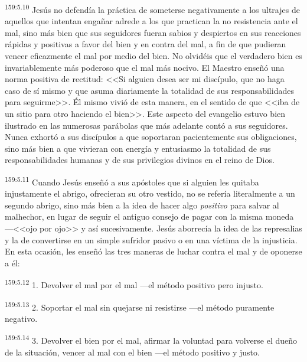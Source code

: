 \par 
\textsuperscript{159:5.10} Jesús no defendía la práctica de someterse negativamente a los ultrajes de aquellos que intentan engañar adrede a los que practican la no resistencia ante el mal, sino más bien que sus seguidores fueran sabios y despiertos en sus reacciones rápidas y positivas a favor del bien y en contra del mal, a fin de que pudieran vencer eficazmente el mal por medio del bien. No olvidéis que el verdadero bien es invariablemente más poderoso que el mal más nocivo. El Maestro enseñó una norma positiva de rectitud: <<Si alguien desea ser mi discípulo, que no haga caso de sí mismo y que asuma diariamente la totalidad de sus responsabilidades para seguirme>>. Él mismo vivió de esta manera, en el sentido de que <<iba de un sitio para otro haciendo el bien>>. Este aspecto del evangelio estuvo bien ilustrado en las numerosas parábolas que más adelante contó a sus seguidores. Nunca exhortó a sus discípulos a que soportaran pacientemente sus obligaciones, sino más bien a que vivieran con energía y entusiasmo la totalidad de sus responsabilidades humanas y de sus privilegios divinos en el reino de Dios.

\par 
\textsuperscript{159:5.11} Cuando Jesús enseñó a sus apóstoles que si alguien les quitaba injustamente el abrigo, ofrecieran su otro vestido, no se refería literalmente a un segundo abrigo, sino más bien a la idea de hacer algo \textit{positivo} para salvar al malhechor, en lugar de seguir el antiguo consejo de pagar con la misma moneda ---<<ojo por ojo>> y así sucesivamente. Jesús aborrecía la idea de las represalias y la de convertirse en un simple sufridor pasivo o en una víctima de la injusticia. En esta ocasión, les enseñó las tres maneras de luchar contra el mal y de oponerse a él:

\par 
\textsuperscript{159:5.12} 1. Devolver el mal por el mal ---el método positivo pero injusto.

\par 
\textsuperscript{159:5.13} 2. Soportar el mal sin quejarse ni resistirse ---el método puramente negativo.

\par 
\textsuperscript{159:5.14} 3. Devolver el bien por el mal, afirmar la voluntad para volverse el dueño de la situación, vencer al mal con el bien ---el método positivo y justo.


